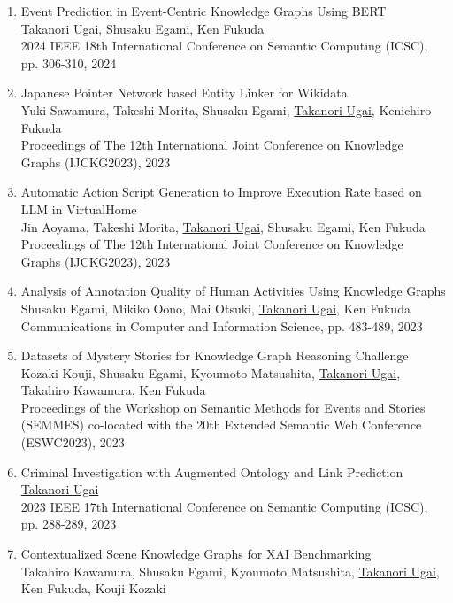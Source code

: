 \documentclass[dvipdfmx]{jlreq}
\begin{document}
\begin{enumerate}
\begin{enumerate}
\begin{enumerate}[label=\arabic*,align=right, labelsep=3pt]
2024 IEEE 18th International Conference on Semantic Computing (ICSC), pp. 301-305, 2024
\item Event Prediction in Event-Centric Knowledge Graphs Using BERT\\
\underline{Takanori Ugai}, Shusaku Egami, Ken Fukuda\\
2024 IEEE 18th International Conference on Semantic Computing (ICSC), pp. 306-310, 2024
\item Japanese Pointer Network based Entity Linker for Wikidata\\
Yuki Sawamura, Takeshi Morita, Shusaku Egami, \underline{Takanori Ugai}, Kenichiro Fukuda\\
Proceedings of The 12th International Joint Conference on Knowledge Graphs (IJCKG2023), 2023
\item Automatic Action Script Generation to Improve Execution Rate based on LLM in VirtualHome\\
Jin Aoyama, Takeshi Morita, \underline{Takanori Ugai}, Shusaku Egami, Ken Fukuda\\
Proceedings of The 12th International Joint Conference on Knowledge Graphs (IJCKG2023), 2023
\item Analysis of Annotation Quality of Human Activities Using Knowledge Graphs\\
Shusaku Egami, Mikiko Oono, Mai Otsuki, \underline{Takanori Ugai}, Ken Fukuda\\
Communications in Computer and Information Science, pp. 483-489, 2023
\item Datasets of Mystery Stories for Knowledge Graph Reasoning Challenge\\
Kozaki Kouji, Shusaku Egami, Kyoumoto Matsushita, \underline{Takanori Ugai}, Takahiro Kawamura, Ken Fukuda\\
Proceedings of the Workshop on Semantic Methods for Events and Stories (SEMMES) co-located with the 20th Extended Semantic Web Conference (ESWC2023), 2023
\item Criminal Investigation with Augmented Ontology and Link Prediction\\
\underline{Takanori Ugai}\\
2023 IEEE 17th International Conference on Semantic Computing (ICSC), pp. 288-289, 2023
\item Contextualized Scene Knowledge Graphs for XAI Benchmarking\\
Takahiro Kawamura, Shusaku Egami, Kyoumoto Matsushita, \underline{Takanori Ugai}, Ken Fukuda, Kouji Kozaki\\

\end{enumerate}
\end{enumerate}
\end{enumerate}
\end{document}
